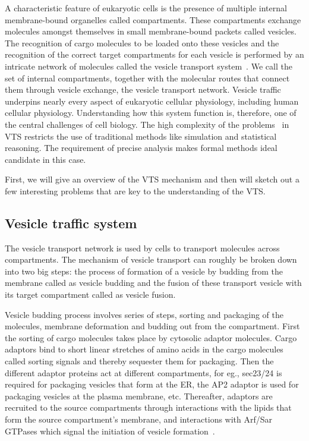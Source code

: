 A characteristic feature of eukaryotic cells is the presence of multiple internal membrane-bound organelles called compartments.
% 
These compartments exchange molecules amongst themselves in small membrane-bound packets called vesicles. 
%
The recognition of cargo molecules to be loaded onto these vesicles and the recognition of the correct target compartments for each vesicle is performed by an intricate network of molecules called the vesicle transport system~\cite{alberts2002molecular}. 
%
We call the set of internal compartments, together with the molecular routes that connect them through vesicle exchange, the vesicle transport network. 
%
Vesicle traffic underpins nearly every aspect of eukaryotic cellular physiology, including
human cellular physiology.
%
Understanding how this system function is, therefore,
one of the central challenges of cell biology.
%
The high complexity of the problems~\cite{mani2016wine, mani2016stacking} in VTS restricts the use of traditional methods like simulation and statistical reasoning. 
The requirement of precise analysis makes formal methods ideal candidate in this case. 

First, we will give an overview of the VTS mechanism and then will sketch out a few interesting problems that are key to the understanding of the VTS.

\subsection{Vesicle traffic system}
%
The vesicle transport network is used by cells to transport molecules across compartments.
% 
The mechanism of vesicle transport can roughly be broken down into two big steps:
%
the process of formation of a vesicle by budding from the membrane called as vesicle budding and the fusion of these transport vesicle with its target compartment called as vesicle fusion. 

Vesicle budding process involves series of steps, sorting and packaging of the molecules, membrane deformation and budding out from the compartment.
%
First the sorting of cargo molecules takes place by cytosolic adaptor molecules. 
%
Cargo adaptors bind to short linear stretches of amino acids in the cargo molecules called sorting signals and thereby sequester them for packaging. 
%
Then the different adaptor proteins act at different compartments, for eg., sec23/24 is required for packaging vesicles that form at the ER, the AP2 adaptor is used for packaging vesicles at the plasma membrane, etc.
%
Thereafter, adaptors are recruited to the source compartments through interactions with the lipids that form the source compartment's membrane, and interactions with Arf/Sar GTPases which signal the initiation of vesicle formation~\cite{paczkowski2015cargo}.

